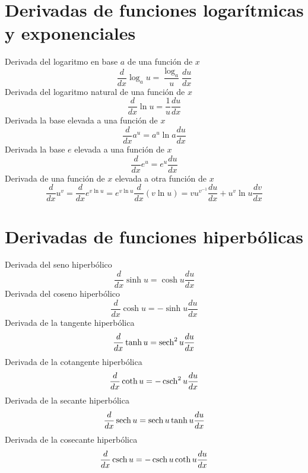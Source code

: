 \section{Derivadas de funciones logarítmicas y exponenciales}
Derivada del logaritmo en base $a$ de una función de $x$
\begin{equation}
	\frac{d}{dx}\log_a u=\frac{\log_a}{u}\frac{du}{dx} 
\end{equation}
Derivada del logaritmo natural de una función de $x$
\begin{equation}
	\frac{d}{dx}\ln u=\frac{1}{u}\frac{du}{dx} 
\end{equation}
Derivada la base elevada a una función de $x$
\begin{equation}
	\frac{d}{dx}a^u=a^u \ln a \frac{du}{dx} 
\end{equation}
Derivada la base $e$ elevada a una función de $x$
\begin{equation}
	\frac{d}{dx}e^u=e^u \frac{du}{dx} 
\end{equation}
Derivada de una función de $x$ elevada a otra función de $x$
\begin{equation}
	\frac{d}{dx}u^v=\frac{d}{dx}e^{v \ln u}=e^{v \ln u} \frac{d}{dx}(v \ln u)=vu^{v^{-1}}\frac{du}{dx}+u^v \ln u \frac{dv}{dx} 
\end{equation}
\section{Derivadas de funciones hiperbólicas}
Derivada del seno hiperbólico
\begin{equation}
	\frac{d}{dx}\sinh u = \cosh u \frac{du}{dx} 
\end{equation}
Derivada del coseno hiperbólico
\begin{equation}
	\frac{d}{dx}\cosh u = -\sinh u \frac{du}{dx} 
\end{equation}
Derivada de la tangente hiperbólica
\begin{equation}
	\frac{d}{dx}\tanh u = \operatorname{sech}^2 u \frac{du}{dx}
\end{equation}
Derivada de la cotangente hiperbólica
\begin{equation}
	\frac{d}{dx}\coth u = -\operatorname{csch}^2 u \frac{du}{dx}
\end{equation}
Derivada de la secante hiperbólica
\begin{equation}
	\frac{d}{dx}\operatorname{sech} u = \operatorname{sech} u \tanh u \frac{du}{dx}
\end{equation}
Derivada de la cosecante hiperbólica
\begin{equation}
	\frac{d}{dx}\operatorname{csch} u = -\operatorname{csch} u \coth u \frac{du}{dx}
\end{equation}
